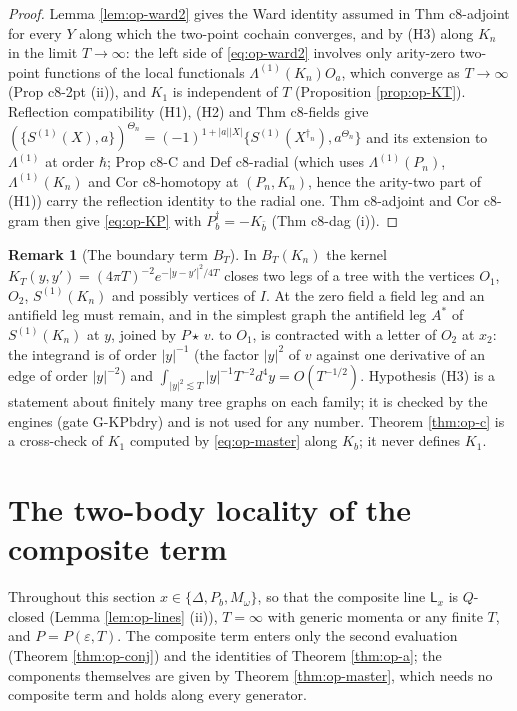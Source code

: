 \documentclass[11pt]{article}
\numberwithin{equation}{section}
\theoremstyle{plain}
\theoremstyle{definition}
\newtheorem{remark}[theorem]{Remark}
\newcommand{\Pst}{P\star}
\begin{document}
\begin{proof}
Lemma \ref{lem:op-ward2} gives the Ward identity assumed in Thm c8-adjoint for every $Y$ along which the two-point cochain converges, and by (H3) along $K_n$ in the limit $T\to\infty$: the left side of \eqref{eq:op-ward2} involves only arity-zero two-point functions of the local functionals $\Lambda^{(1)}(K_n)O_a$, which converge as $T\to\infty$ (Prop c8-2pt (ii)), and $K_1$ is independent of $T$ (Proposition \ref{prop:op-KT}). Reflection compatibility (H1), (H2) and Thm c8-fields give $(\{S^{(1)}(X),a\})^{\Theta_n}=(-1)^{1+|a||X|}\{S^{(1)}(X^{\dagger_n}),a^{\Theta_n}\}$ and its extension to $\Lambda^{(1)}$ at order $\hbar$; Prop c8-C and Def c8-radial (which uses $\Lambda^{(1)}(P_n)$, $\Lambda^{(1)}(K_n)$ and Cor c8-homotopy at $(P_n,K_n)$, hence the arity-two part of (H1)) carry the reflection identity to the radial one. Thm c8-adjoint and Cor c8-gram then give \eqref{eq:op-KP} with $P_b^\dagger=-K_{\bar b}$ (Thm c8-dag (i)).
\end{proof}

\begin{remark}[The boundary term $B_T$]
\label{rem:op-BT}
In $B_T(K_n)$ the kernel $K_T(y,y')=(4\pi T)^{-2}e^{-|y-y'|^2/4T}$ closes two legs of a tree with the vertices $O_1$, $O_2$, $S^{(1)}(K_n)$ and possibly vertices of $I$. At the zero field a field leg and an antifield leg must remain, and in the simplest graph the antifield leg $A^*$ of $S^{(1)}(K_n)$ at $y$, joined by $\Pst\,v.$ to $O_1$, is contracted with a letter of $O_2$ at $x_2$: the integrand is of order $|y|^{-1}$ (the factor $|y|^2$ of $v$ against one derivative of an edge of order $|y|^{-2}$) and $\int_{|y|^2\lesssim T}|y|^{-1}T^{-2}d^4y=O(T^{-1/2})$. Hypothesis (H3) is a statement about finitely many tree graphs on each family; it is checked by the engines (gate G-KPbdry) and is not used for any number. Theorem \ref{thm:op-c} is a cross-check of $K_1$ computed by \eqref{eq:op-master} along $K_b$; it never defines $K_1$.
\end{remark}

\section{The two-body locality of the composite term}
\label{sec:op-local}

Throughout this section $x\in\{\Delta,P_b,M_\omega\}$, so that the composite line $\mathsf L_x$ is $Q$-closed (Lemma \ref{lem:op-lines} (ii)), $T=\infty$ with generic momenta or any finite $T$, and $P=P(\varepsilon,T)$. The composite term enters only the second evaluation (Theorem \ref{thm:op-conj}) and the identities of Theorem \ref{thm:op-a}; the components themselves are given by Theorem \ref{thm:op-master}, which needs no composite term and holds along every generator.
\end{document}
